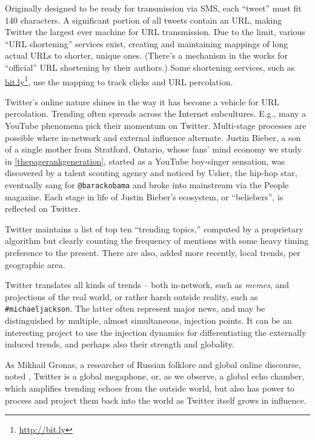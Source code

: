 \documentclass[10pt,oneside]{memoir}
\begin{document}
Originally designed to be ready for transmission via SMS, each ``tweet'' must fit 140 characters.  A significant portion of all tweets contain an URL, making Twitter the largest ever machine for URL transmission.  Due to the limit, various ``URL shortening'' services exist, creating and maintaining mappings of long actual URLs to shorter, unique ones.  (There's a mechanism in the works for ``official'' URL shortening by their authors.)  Some shortening services, such as \href{http://bit.ly}{bit.ly}\footnote{\href{http://bit.ly}{http://bit.ly}}, use the mapping to track clicks and URL percolation.


Twitter's online nature shines in the way it has become a vehicle for URL percolation.  Trending often spreads across the Internet subcultures.  E.g., many a YouTube phenomena pick their momentum on Twitter.  Multi-stage processes are possible where in-network and external influence alternate.  Justin Bieber, a son of a single mother from Stratford, Ontario, whose fans' mind economy we study in \ref{thepagerankgeneration}, started as a YouTube boy-singer sensation, was discovered by a talent scouting agency and noticed by Usher, the hip-hop star, eventually sang for \texttt{@barackobama}  and broke into mainstream via the People magazine.   Each stage in life of Justin Bieber's ecosystem, or ``beliebers'', is reflected on Twitter.  


Twitter maintains a list of top ten ``trending topics,'' computed by a proprietary algorithm but clearly counting the frequency of mentions with some heavy timing preference to the present.  There are also, added more recently, local trends, per geographic area.  


Twitter translates all kinds of trends -- both in-network, such as {\itshape memes}, and projections of the real world, or rather harsh outside reality, such as \texttt{\#michaeljackson}.  The latter often represent major news, and may be distinguished by multiple, almost simultaneous, injection points.  It can be an interesting project to use the injection dynamics for differentiating the externally induced trends, and perhaps also their strength and globality.


As Mikhail Gronas, a researcher of Russian folklore and global online discourse, noted \cite{Gronas:2010:Private}, Twitter is a global megaphone, or, as we observe, a global echo chamber, which amplifies trending echoes from the outside world, but also has power to process and project them back into the world as Twitter itself grows in influence.
\end{document}
